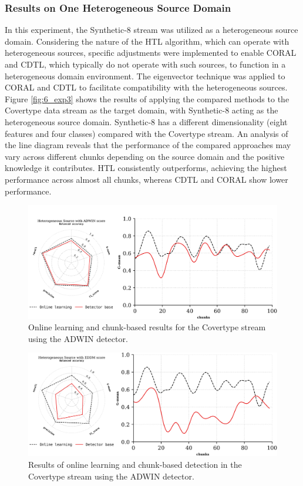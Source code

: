 \subsubsection{Results on One Heterogeneous Source Domain}
In this experiment, the Synthetic-8 stream was utilized as a heterogeneous source domain. Considering the nature of the HTL algorithm, which can operate with heterogeneous sources, specific adjustments were implemented to enable CORAL and CDTL, which typically do not operate with such sources, to function in a heterogeneous domain environment. The eigenvector technique was applied to CORAL and CDTL to facilitate compatibility with the heterogeneous sources. Figure \ref{fig:6_exp3} shows the results of applying the compared methods to the Covertype data stream as the target domain, with Synthetic-8 acting as the heterogeneous source domain. Synthetic-8 has a different dimensionality (eight features and four classes) compared with the Covertype stream. An analysis of the line diagram reveals that the performance of the compared approaches may vary across different chunks depending on the source domain and the positive knowledge it contributes. HTL consistently outperforms, achieving the highest performance across almost all chunks, whereas CDTL and CORAL show lower performance.

\begin{figure}[H]
	\centering
	\includegraphics[width=1\linewidth]{6_transfer_learning/figures/exp4.png}
	\caption{Online learning and chunk-based results for the Covertype stream using the ADWIN detector.}
	\label{fig:6_exp6}
\end{figure}

\begin{figure}[H]
	\centering
	\includegraphics[width=1\linewidth]{6_transfer_learning/figures/exp5.png}
  \caption{Results of online learning and chunk-based detection in the Covertype stream using the ADWIN detector.}
	\label{fig:6_exp7}
\end{figure}


